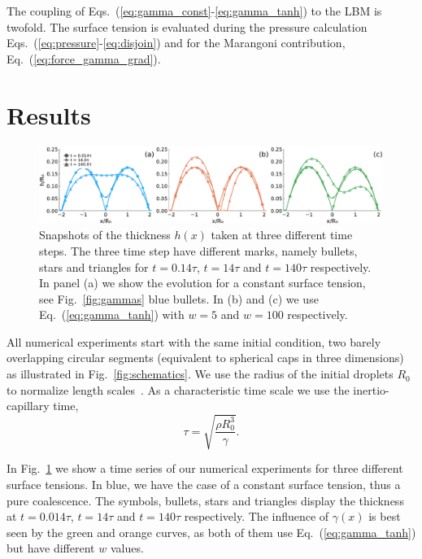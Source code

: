 \documentclass[twocolumn,amsmath,amssymb,showpacs,nofootinbib,prfluids,superscriptaddress]{revtex4-2} %
\begin{document}
The coupling of Eqs.~(\ref{eq:gamma_const}-\ref{eq:gamma_tanh}) to the LBM is twofold.
The surface tension is evaluated during the pressure calculation Eqs.~(\ref{eq:pressure}-\ref{eq:disjoin}) and for the Marangoni contribution, Eq.~(\ref{eq:force_gamma_grad}).

\section{Results}\label{sec:results}
\begin{figure}
    \centering
    \includegraphics[width=1.0\textwidth]{Figures/height_three_times_three_gamma.pdf}
    \caption{Snapshots of the thickness $h(x)$ taken at three different time steps.
    The three time step have different marks, namely bullets, stars and triangles for $t=0.14\tau$, $t=14\tau$ and $t=140\tau$ respectively.
    In panel (a) we show the evolution for a constant surface tension, see Fig.~\ref{fig:gammas} blue bullets.
    In (b) and (c) we use Eq.~(\ref{eq:gamma_tanh}) with $w =5$ and $w=100$ respectively. 
    }
    \label{fig:final_state}
\end{figure}
All numerical experiments start with the same initial condition, two barely overlapping circular segments (equivalent to spherical caps in three dimensions) as illustrated in Fig.~\ref{fig:schematics}.
We use the radius of the initial droplets $R_0$ to normalize length scales~\cite{PhysRevLett.111.144502, PhysRevLett.95.164503}.
As a characteristic time scale we use the inertio-capillary time, 
\begin{equation}\label{eq:inertio-cap-time}
    \tau = \sqrt{\frac{\rho R_0^3}{\gamma}}.
\end{equation}

In Fig.~\ref{fig:final_state} we show a time series of our numerical experiments for three different surface tensions.
In blue, we have the case of a constant surface tension, thus a pure coalescence.
The symbols, bullets, stars and triangles display the thickness at $t=0.014\tau$, $t=14\tau$ and $t=140\tau$ respectively. 
The influence of $\gamma(x)$ is best seen by the green and orange curves, as both of them use Eq.~(\ref{eq:gamma_tanh}) but have different $w$ values.
\end{document}
